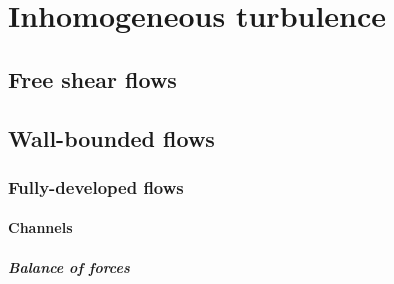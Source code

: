 \documentclass[oneside,a4paper,11pt]{report}
\begin{document}
\part{Inhomogeneous turbulence}

%
\chapter{Free shear flows}
%

%
\chapter{Wall-bounded flows}
%

\section{Fully-developed flows}

\subsection{Channels}

\subsubsection{Balance of forces}
\end{document}
